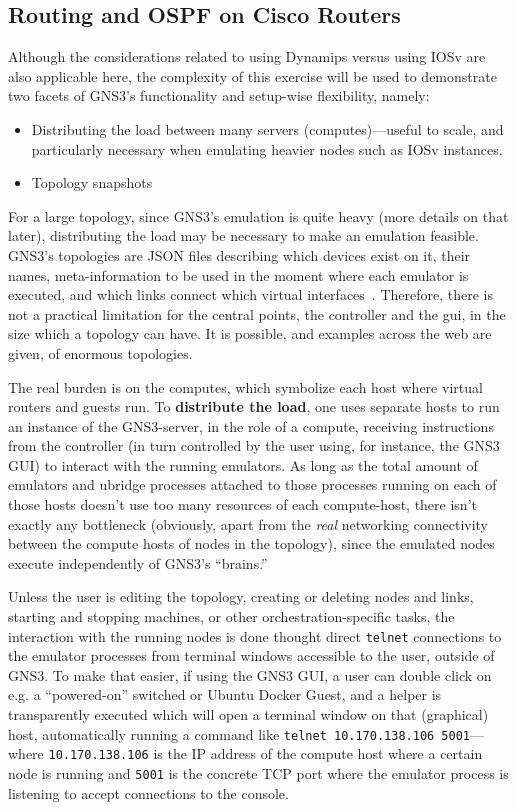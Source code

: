 \subsection{Routing and OSPF on Cisco Routers}
\label{subsec:gns3ospfrouting}

Although the considerations related to using Dynamips versus using IOSv are also applicable here, the complexity of this exercise will be used to demonstrate two facets of GNS3's functionality and setup-wise flexibility, namely:
\begin{itemize}
  \item Distributing the load between many servers (computes)---useful to scale, and particularly necessary when emulating heavier nodes such as IOSv instances.
  \item Topology snapshots
\end{itemize}

For a large topology, since GNS3's emulation is quite heavy (more details on that later), distributing the load may be necessary to make an emulation feasible.
GNS3's topologies are JSON files describing which devices exist on it, their names, meta-information to be used in the moment where each emulator is executed, and which links connect which virtual interfaces~\cite{thebookofgns3}.
Therefore, there is not a practical limitation for the central points, the controller and the \gls{gui}, in the size which a topology can have.
It is possible, and examples across the web are given, of enormous topologies.

The real burden is on the computes, which symbolize each host where virtual routers and guests run.
To \textbf{distribute the load}, one uses separate hosts to run an instance of the GNS3-server, in the role of a compute, receiving instructions from the controller (in turn controlled by the user using, for instance, the GNS3 GUI) to interact with the running emulators.
As long as the total amount of emulators and ubridge processes attached to those processes running on each of those hosts doesn't use too many resources of each compute-host, there isn't exactly any bottleneck (obviously, apart from the \emph{real} networking connectivity between the compute hosts of nodes in the topology), since the emulated nodes execute independently of GNS3's ``brains.''

Unless the user is editing the topology, creating or deleting nodes and links, starting and stopping machines, or other orchestration-specific tasks, the interaction with the running nodes is done thought direct \texttt{telnet} connections to the emulator processes from terminal windows accessible to the user, outside of GNS3.
To make that easier, if using the GNS3 GUI, a user can double click on e.g. a ``powered-on'' switched or Ubuntu Docker Guest, and a helper is transparently executed which will open a terminal window on that (graphical) host, automatically running a command like \texttt{telnet 10.170.138.106 5001}---where \texttt{10.170.138.106} is the IP address of the compute host where a certain node is running and \texttt{5001} is the concrete TCP port where the emulator process is listening to accept connections to the console.


